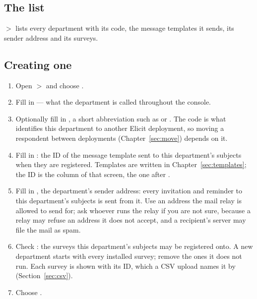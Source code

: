 \documentclass[11pt, a4paper]{article}
\begin{document}
\subsection{The list}

 $>$  lists every department with its code, the message templates it
sends, its sender address and its surveys.


\subsection{Creating one}

\begin{enumerate}
  \item Open  $>$  and choose .
  \item Fill in  — what the department is called throughout the console.
  \item Optionally fill in , a short abbreviation such as  or
        . The code is what identifies this department to another Elicit deployment, so
        moving a respondent between deployments (Chapter~\ref{sec:move}) depends on it.
  \item Fill in : the ID of the message template sent to this
        department's subjects when they are registered. Templates are written in
        Chapter~\ref{sec:templates}; the ID is the  column of that screen, the one after
        .
  \item Fill in , the department's sender address: every invitation and
        reminder to this department's subjects is sent from it. Use an address the mail relay
        is allowed to send for; ask whoever runs the relay if you are not sure, because a relay
        may refuse an address it does not accept, and a recipient's server may file the mail as
        spam.
  \item Check : the surveys this department's subjects may be registered onto. A new
        department starts with every installed survey; remove the ones it does not run. Each
        survey is shown with its ID, which a CSV upload names it by (Section~\ref{sec:csv}).
  \item Choose .
\end{enumerate}
\end{document}
